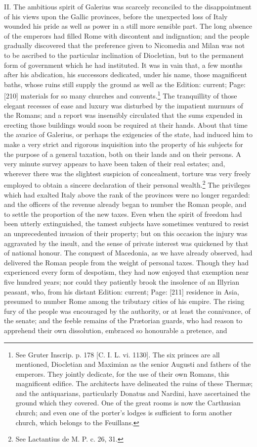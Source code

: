 II. The ambitious spirit of Galerius was scarcely reconciled to the disappointment of his views upon the Gallic provinces, before the unexpected loss of Italy wounded his pride as well as power in a still more sensible part. The long absence of the emperors had filled Rome with discontent and indignation; and the people gradually discovered that the preference given to Nicomedia and Milan was not to be ascribed to the particular inclination of Diocletian, but to the permanent form of government which he had instituted. It was in vain that, a few months after his abdication, his successors dedicated, under his name, those magnificent baths, whose ruins still supply the ground as well as the Edition: current; Page: [210] materials for so many churches and convents.\footnote{See Gruter Inscrip. p. 178 [C. I. L. vi. 1130]. The six princes are all mentioned, Diocletian and Maximian as the senior Augusti and fathers of the emperors. They jointly dedicate, for the use of their own Romans, this magnificent edifice. The architects have delineated the ruins of these Thermæ; and the antiquarians, particularly Donatus and Nardini, have ascertained the ground which they covered. One of the great rooms is now the Carthusian church; and even one of the porter\texthebrew{}’s lodges is sufficient to form another church, which belongs to the Feuillans.} The tranquillity of those elegant recesses of ease and luxury was disturbed by the impatient murmurs of the Romans; and a report was insensibly circulated that the sums expended in erecting those buildings would soon be required at their hands. About that time the avarice of Galerius, or perhaps the exigencies of the state, had induced him to make a very strict and rigorous inquisition into the property of his subjects for the purpose of a general taxation, both on their lands and on their persons. A very minute survey appears to have been taken of their real estates; and, wherever there was the slightest suspicion of concealment, torture was very freely employed to obtain a sincere declaration of their personal wealth.\footnote{See Lactantius de M. P. c. 26, 31.} The privileges which had exalted Italy above the rank of the provinces were no longer regarded: and the officers of the revenue already began to number the Roman people, and to settle the proportion of the new taxes. Even when the spirit of freedom had been utterly extinguished, the tamest subjects have sometimes ventured to resist an unprecedented invasion of their property; but on this occasion the injury was aggravated by the insult, and the sense of private interest was quickened by that of national honour. The conquest of Macedonia, as we have already observed, had delivered the Roman people from the weight of personal taxes. Though they had experienced every form of despotism, they had now enjoyed that exemption near five hundred years; nor could they patiently brook the insolence of an Illyrian peasant, who, from his distant Edition: current; Page: [211] residence in Asia, presumed to number Rome among the tributary cities of his empire. The rising fury of the people was encouraged by the authority, or at least the connivance, of the senate; and the feeble remains of the Prætorian guards, who had reason to apprehend their own dissolution, embraced so honourable a pretence, and 
